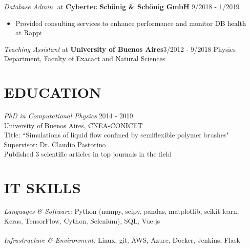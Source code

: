 \documentclass[margin]{res}
\begin{document}
\begin{resume}
    {\sl Database Admin.} at {\bf Cybertec Sch\"onig \& Sch\"onig GmbH} \hfill 9/2018 - 1/2019
	\begin{itemize}  \itemsep -2pt %
		 \item Provided consulting services to enhance performance and 
             monitor DB health at Rappi
    \end{itemize}
        {\sl Teaching Assistant} at {\bf University of Buenos Aires}\hfill 3/2012 - 9/2018
		Physics Department, Faculty of Exacact and Natural Sciences 

\section{EDUCATION} {\sl PhD in Computational Physics}  \hfill 2014 - 2019 \\
                University of Buenos Aires, CNEA-CONICET \\ 
                Title: ``Simulations of liquid flow confined by semiflexible 
		polymer brushes"  \\
                Supervisor: Dr. Claudio Pastorino \\ 
                Published 3 scientific articles in top journals in the field \\ 

 
    \section{IT SKILLS} {\sl Languages \& Software:} Python (numpy, scipy, pandas, matplotlib, scikit-learn, Keras, TensorFlow, Cython, Selenium), SQL, Vue.js \\ \\ 
    {\sl Infrastructure \& Environment:} Linux, git, AWS, Azure, Docker, Jenkins, Flask \\
               

\end{resume}
\end{document}
